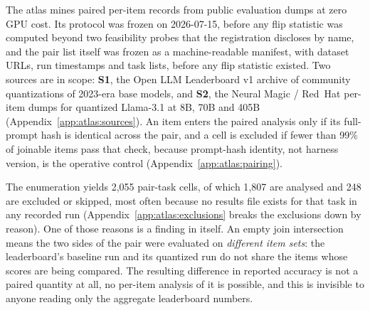The atlas mines paired per-item records from public evaluation dumps at zero GPU
cost. Its protocol was frozen on 2026-07-15, before any flip statistic was
computed beyond two feasibility probes that the registration discloses by name,
and the pair list itself was frozen as a machine-readable manifest, with dataset
URLs, run timestamps and task lists, before any flip statistic existed.
Two sources are in scope: \textbf{S1}, the Open LLM Leaderboard v1 archive of
community quantizations of 2023-era base models, and \textbf{S2}, the Neural
Magic / Red~Hat per-item dumps for quantized Llama-3.1 at 8B, 70B and 405B
(Appendix~\ref{app:atlas:sources}). An item enters the paired analysis
only if its full-prompt hash is identical across the pair, and a cell is
excluded if fewer than 99\% of joinable items pass that check, because
prompt-hash identity, not harness version, is the operative control
(Appendix~\ref{app:atlas:pairing}).

\label{sec:atlas:coverage}%
The enumeration yields 2{,}055 pair-task cells, of which 1{,}807 are analysed
and 248 are excluded or skipped, most often because no results file exists for
that task in any recorded run (Appendix~\ref{app:atlas:exclusions} breaks the
exclusions down by reason). One of those reasons is a finding in itself. An
empty join intersection means the two sides of the pair were evaluated on
\emph{different item sets}: the leaderboard's baseline run and its quantized run
do not share the items whose scores are being compared. The resulting difference
in reported accuracy is not a paired quantity at all, no per-item analysis of it
is possible, and this is invisible to anyone reading only the aggregate
leaderboard numbers.

